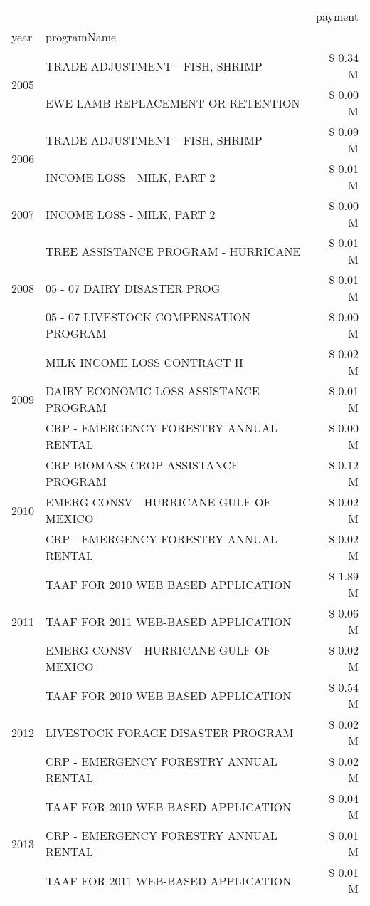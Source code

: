 \begin{tabular}{llr}
\toprule
 &  & payment \\
year & programName &  \\
\midrule
\multirow[t]{2}{*}{2005} & TRADE ADJUSTMENT - FISH, SHRIMP & \$ 0.34 M \\
 & EWE LAMB REPLACEMENT OR RETENTION & \$ 0.00 M \\
\cline{1-3}
\multirow[t]{2}{*}{2006} & TRADE ADJUSTMENT - FISH, SHRIMP & \$ 0.09 M \\
 & INCOME LOSS - MILK, PART 2 & \$ 0.01 M \\
\cline{1-3}
2007 & INCOME LOSS - MILK, PART 2 & \$ 0.00 M \\
\cline{1-3}
\multirow[t]{3}{*}{2008} & TREE ASSISTANCE PROGRAM - HURRICANE & \$ 0.01 M \\
 & 05 - 07 DAIRY DISASTER PROG & \$ 0.01 M \\
 & 05 - 07 LIVESTOCK COMPENSATION PROGRAM & \$ 0.00 M \\
\cline{1-3}
\multirow[t]{3}{*}{2009} & MILK INCOME LOSS CONTRACT II & \$ 0.02 M \\
 & DAIRY ECONOMIC LOSS ASSISTANCE PROGRAM & \$ 0.01 M \\
 & CRP - EMERGENCY FORESTRY ANNUAL RENTAL & \$ 0.00 M \\
\cline{1-3}
\multirow[t]{3}{*}{2010} & CRP BIOMASS CROP ASSISTANCE PROGRAM & \$ 0.12 M \\
 & EMERG CONSV - HURRICANE GULF OF MEXICO & \$ 0.02 M \\
 & CRP - EMERGENCY FORESTRY ANNUAL RENTAL & \$ 0.02 M \\
\cline{1-3}
\multirow[t]{3}{*}{2011} & TAAF FOR 2010 WEB BASED APPLICATION & \$ 1.89 M \\
 & TAAF FOR 2011 WEB-BASED APPLICATION & \$ 0.06 M \\
 & EMERG CONSV - HURRICANE GULF OF MEXICO & \$ 0.02 M \\
\cline{1-3}
\multirow[t]{3}{*}{2012} & TAAF FOR 2010 WEB BASED APPLICATION & \$ 0.54 M \\
 & LIVESTOCK FORAGE DISASTER PROGRAM & \$ 0.02 M \\
 & CRP - EMERGENCY FORESTRY ANNUAL RENTAL & \$ 0.02 M \\
\cline{1-3}
\multirow[t]{3}{*}{2013} & TAAF FOR 2010 WEB BASED APPLICATION & \$ 0.04 M \\
 & CRP - EMERGENCY FORESTRY ANNUAL RENTAL & \$ 0.01 M \\
 & TAAF FOR 2011 WEB-BASED APPLICATION & \$ 0.01 M \\

\end{tabular}
